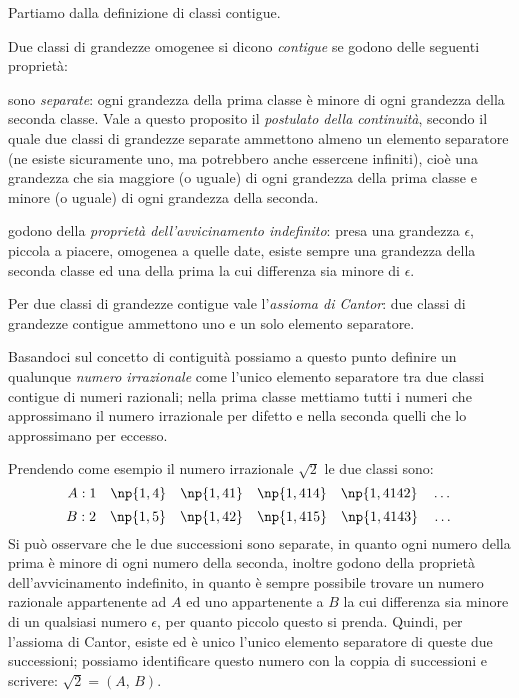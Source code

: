 Partiamo dalla definizione di classi contigue.
\begin{definizione}
Due classi di grandezze omogenee si dicono \emph{contigue} se godono 
delle seguenti proprietà:
\begin{itemize*}
\item sono \emph{separate}: ogni grandezza della prima classe è 
minore di ogni grandezza della seconda classe. Vale a questo proposito 
il \emph{postulato della continuità}, secondo il quale due classi di 
grandezze separate ammettono almeno un elemento separatore (ne esiste 
sicuramente uno, ma potrebbero anche essercene infiniti), cioè una 
grandezza che sia maggiore (o uguale) di ogni grandezza della prima 
classe e minore (o uguale) di ogni grandezza della seconda.
\item godono della \emph{proprietà dell'avvicinamento indefinito}: 
presa una grandezza \(\epsilon\), piccola a piacere, omogenea a quelle 
date, esiste sempre una grandezza della seconda classe ed una della 
prima la cui differenza sia minore di \(\epsilon\).
\end{itemize*}
\end{definizione}

Per due classi di grandezze contigue vale l'\emph{assioma di Cantor}: 
due classi di grandezze contigue ammettono uno e un solo elemento 
separatore.

Basandoci sul concetto di contiguità possiamo a questo punto definire 
un qualunque \emph{numero irrazionale} come l'unico elemento 
separatore tra due classi contigue di numeri razionali; nella prima 
classe mettiamo tutti i numeri che approssimano il numero irrazionale 
per difetto e nella seconda quelli che lo approssimano per eccesso.

Prendendo come esempio il numero irrazionale \(\sqrt{2}\) le due classi 
sono:
\[A: 1\quad \np{1,4}\quad \np{1,41}\quad \np{1,414}\quad 
\np{1,4142}\quad \ldots{}\]
\[B: 2\quad \np{1,5}\quad \np{1,42}\quad \np{1,415}\quad 
\np{1,4143}\quad \ldots{}\]
Si può osservare che le due successioni sono separate, in quanto ogni 
numero della prima è minore di ogni numero della seconda, inoltre 
godono della proprietà dell'avvicinamento indefinito, in quanto è 
sempre possibile trovare un numero razionale appartenente ad \(A\) ed 
uno appartenente a \(B\) la cui differenza sia minore di un qualsiasi 
numero \(\epsilon\), per quanto piccolo questo si prenda.
Quindi, per l'assioma di Cantor, esiste ed è unico l'unico elemento 
separatore di queste due successioni; possiamo identificare questo 
numero con la coppia di successioni e scrivere: \(\sqrt{2} = (A\text{, 
}B)\).

